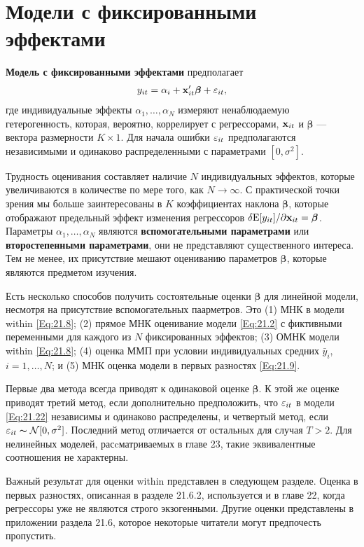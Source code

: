 \section{Модели с фиксированными эффектами}
 

\textbf{Модель с фиксированными эффектами} предполагает 
\begin{align}
y_{it}=\alpha_i +\mathbf{x}'_{it}\bm\beta +\varepsilon_{it},
\label{Eq:21.22}
\end{align}
где индивидуальные эффекты $\alpha_1, \dots , \alpha_N$ измеряют ненаблюдаемую гетерогенность, которая, вероятно, коррелирует с регрессорами, $\mathbf{x}_{it}$ и $\bm\beta$ --- вектора размерности $K \times 1$. Для начала ошибки $\varepsilon_{it}$ предполагаются независимыми и одинаково распределенными с параметрами $[0, \sigma^2]$.

Трудность оценивания составляет наличие $N$ индивидуальных эффектов, которые увеличиваются в количестве по мере того, как $N \rightarrow \infty$. С практической точки зрения мы больше заинтересованы в $K$ коэффициентах наклона $\bm\beta$, которые отображают  предельный эффект изменения регрессоров $\delta \mathrm E[y_{it}]/ \partial \mathbf{x}_{it}=\bm\beta$. Параметры $\alpha_1, \dots, \alpha_N$ являются \textbf{вспомогательными параметрами} или \textbf{второстепенными параметрами}, они не представляют существенного интереса. Тем не менее, их присутствие мешают оцениванию параметров $\bm\beta$, которые являются предметом изучения.

Есть несколько способов получить состоятельные оценки $\bm\beta$ для линейной модели, несмотря на присутствие вспомогательных паарметров. Это (1) МНК в модели within \ref{Eq:21.8}; (2) прямое МНК оценивание модели \ref{Eq:21.2} с фиктивными переменными для каждого из $N$ фиксированных эффектов; (3) ОМНК модели within \ref{Eq:21.8}; (4) оценка ММП при условии индивидуальных средних $\bar{y}_i$, $i=1, \dots, N$; и (5) МНК оценка модели в первых разностях \ref{Eq:21.9}.

Первые два метода всегда приводят к одинаковой оценке $\bm\beta$. К этой же оценке приводят третий метод, если дополнительно предположить, что $\varepsilon_{it}$ в модели \ref{Eq:21.22} независимы и одинаково распределены, и четвертый метод, если $\varepsilon_{it} \thicksim \mathcal N[0, \sigma^2]$. Последний метод отличается от остальных для случая  $T>2$. Для нелинейных моделей, расcматриваемых в главе 23, такие эквивалентные соотношения не характерны. 

Важный результат для оценки within представлен в следующем разделе. Оценка в первых разностях, описанная в разделе 21.6.2, используется и в главе 22, когда регрессоры уже не являются строго экзогенными. Другие оценки представлены в приложении раздела 21.6, которое некоторые читатели могут предпочесть пропустить.


